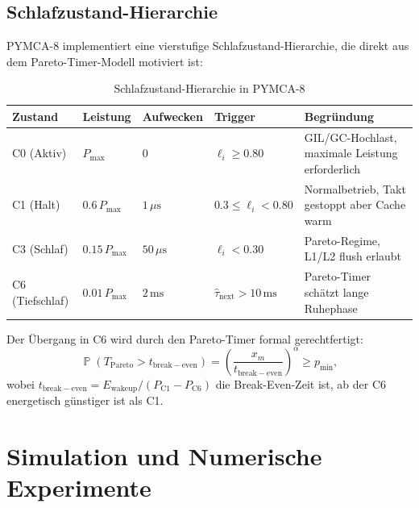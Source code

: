 ﻿\documentclass[a4paper,12pt]{scrreprt}
\theoremstyle{definition}
\DeclareMathOperator{\Prob}{\mathbb{P}}
\newcommand{\Pareto}{\mathrm{Pareto}}
\begin{document}
	\subsection{Schlafzustand-Hierarchie}
	
	PYMCA-8 implementiert eine vierstufige Schlafzustand-Hierarchie,
	die direkt aus dem Pareto-Timer-Modell motiviert ist:
	
	\begin{table}[H]
		\centering
		\caption{Schlafzustand-Hierarchie in PYMCA-8}
		\label{tab:sleep}
		\renewcommand{\arraystretch}{1.3}
		\begin{tabular}{llllp{4.5cm}}
			\toprule
			\textbf{Zustand} & \textbf{Leistung} & \textbf{Aufwecken}
			& \textbf{Trigger} & \textbf{Begründung} \\
			\midrule
			C0 (Aktiv) & $P_{\max}$ & $0$ & $\ell_i \ge 0.80$ &
			GIL/GC-Hochlast, maximale Leistung erforderlich \\
			C1 (Halt) & $0.6\,P_{\max}$ & $1\,\mu\mathrm{s}$ & $0.3 \le \ell_i < 0.80$ &
			Normalbetrieb, Takt gestoppt aber Cache warm \\
			C3 (Schlaf) & $0.15\,P_{\max}$ & $50\,\mu\mathrm{s}$ & $\ell_i < 0.30$ &
			Pareto-Regime, L1/L2 flush erlaubt \\
			C6 (Tiefschlaf) & $0.01\,P_{\max}$ & $2\,\mathrm{ms}$ &
			$\hat\tau_{\mathrm{next}} > 10\,\mathrm{ms}$ &
			Pareto-Timer schätzt lange Ruhephase \\
			\bottomrule
		\end{tabular}
	\end{table}
	
	Der Übergang in C6 wird durch den Pareto-Timer formal gerechtfertigt:
	\begin{equation}
		\Prob\left(T_{\Pareto} > t_{\mathrm{break-even}}\right)
		= \left(\frac{x_m}{t_{\mathrm{break-even}}}\right)^\alpha
		\ge p_{\mathrm{min}},
		\label{eq:c6_trigger}
	\end{equation}
	wobei $t_{\mathrm{break-even}} = E_{\mathrm{wakeup}} / (P_{\mathrm{C1}} -
	P_{\mathrm{C6}})$ die Break-Even-Zeit ist, ab der C6 energetisch
	günstiger ist als C1.
	
	\section{Simulation und Numerische Experimente}
	
\end{document}
